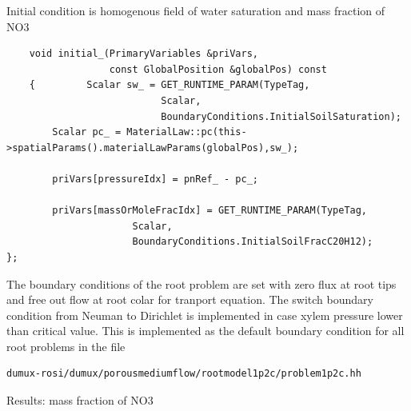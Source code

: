 Initial condition is homogenous field of water saturation and mass fraction of NO3

\begin{lstlisting}
    void initial_(PrimaryVariables &priVars,
                  const GlobalPosition &globalPos) const
    {         Scalar sw_ = GET_RUNTIME_PARAM(TypeTag,
                           Scalar,
                           BoundaryConditions.InitialSoilSaturation);
        Scalar pc_ = MaterialLaw::pc(this->spatialParams().materialLawParams(globalPos),sw_);

        priVars[pressureIdx] = pnRef_ - pc_;

        priVars[massOrMoleFracIdx] = GET_RUNTIME_PARAM(TypeTag,
                      Scalar,
                      BoundaryConditions.InitialSoilFracC20H12);
};
\end{lstlisting}

The boundary conditions of the root problem are set with zero flux at root tips and free out flow at root colar for tranport equation. The switch boundary condition from Neuman to Dirichlet is implemented in case xylem pressure lower than critical value. This is implemented as the default boundary condition for all root problems in the file 
\begin{lstlisting}
dumux-rosi/dumux/porousmediumflow/rootmodel1p2c/problem1p2c.hh
\end{lstlisting}



Results: mass fraction of NO3

